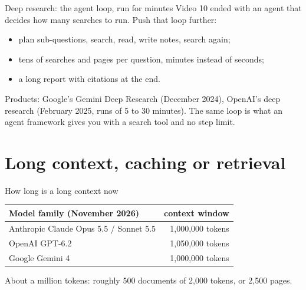\begin{frame}{Deep research: the agent loop, run for minutes}
  \vspace{0.2em}
  Video 10 ended with an agent that decides how many searches to run. Push that loop further:

  \vspace{0.3em}
  \begin{itemize}
    \item plan sub-questions, search, read, write notes, search again;
    \item tens of searches and pages per question, minutes instead of seconds;
    \item a long report with citations at the end.
  \end{itemize}

  \vspace{0.3em}
  {\small Products: Google's Gemini Deep Research (December 2024), OpenAI's deep research (February
  2025, runs of 5 to 30 minutes). The same loop is what an agent framework gives you with a
  search tool and no step limit.}

  \vspace{0.3em}
\end{frame}

\section{Long context, caching or retrieval}

\begin{frame}{How long is a long context now}
  \vspace{0.3em}
  \begin{center}
  \small
  \begin{tabular}{lr}
    \toprule
    \textbf{Model family (November 2026)} & \textbf{context window} \\
    \midrule
    Anthropic Claude Opus 5.5 / Sonnet 5.5 & 1{,}000{,}000 tokens \\
    OpenAI GPT-6.2 & 1{,}050{,}000 tokens \\
    Google Gemini 4 & 1{,}000{,}000 tokens \\
    \bottomrule
  \end{tabular}
  \end{center}

  \vspace{0.3em}
  {\small About a million tokens: roughly 500 documents of 2{,}000 tokens, or 2{,}500 pages.}

  \vspace{0.3em}
\end{frame}

